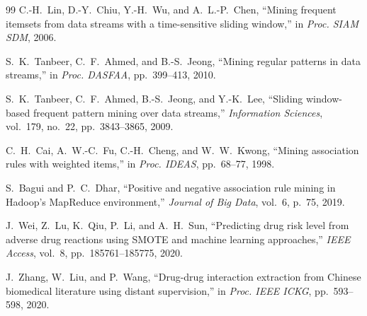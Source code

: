 \documentclass[10pt,twocolumn]{article}
\theoremstyle{plain}
\theoremstyle{definition}
\theoremstyle{remark}
\begin{document}
\begin{thebibliography}{99}
C.-H.~Lin, D.-Y.~Chiu, Y.-H.~Wu, and A.~L.-P.~Chen,
``Mining frequent itemsets from data streams with a time-sensitive
sliding window,''
in \textit{Proc. SIAM SDM}, 2006.

S.~K.~Tanbeer, C.~F.~Ahmed, and B.-S.~Jeong,
``Mining regular patterns in data streams,''
in \textit{Proc. DASFAA}, pp.~399--413, 2010.

S.~K.~Tanbeer, C.~F.~Ahmed, B.-S.~Jeong, and Y.-K.~Lee,
``Sliding window-based frequent pattern mining over data streams,''
\textit{Information Sciences}, vol.~179, no.~22, pp.~3843--3865, 2009.

C.~H.~Cai, A.~W.-C.~Fu, C.-H.~Cheng, and W.~W.~Kwong,
``Mining association rules with weighted items,''
in \textit{Proc. IDEAS}, pp.~68--77, 1998.

S.~Bagui and P.~C.~Dhar,
``Positive and negative association rule mining in Hadoop's MapReduce
environment,''
\textit{Journal of Big Data}, vol.~6, p.~75, 2019.

J.~Wei, Z.~Lu, K.~Qiu, P.~Li, and A.~H.~Sun,
``Predicting drug risk level from adverse drug reactions using SMOTE
and machine learning approaches,''
\textit{IEEE Access}, vol.~8, pp.~185761--185775, 2020.

J.~Zhang, W.~Liu, and P.~Wang,
``Drug-drug interaction extraction from Chinese biomedical literature
using distant supervision,''
in \textit{Proc. IEEE ICKG}, pp.~593--598, 2020.

\end{thebibliography}
\end{document}
